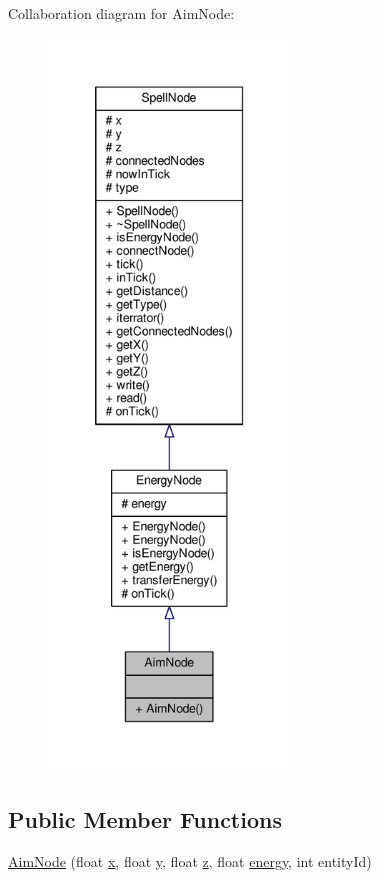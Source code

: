Collaboration diagram for Aim\-Node\-:
\nopagebreak
\begin{figure}[H]
\begin{center}
\leavevmode
\includegraphics[height=550pt]{class_aim_node__coll__graph}
\end{center}
\end{figure}
\subsection*{Public Member Functions}
\begin{DoxyCompactItemize}
\item 
\hyperlink{class_aim_node_a3344a03af5a5fef82bc665e55dc68d3f}{Aim\-Node} (float \hyperlink{class_spell_node_a916f2a709a674dd2a61530b6acc339cc}{x}, float \hyperlink{class_spell_node_a754d80fd0fd82dbc12443b5f277b9fb4}{y}, float \hyperlink{class_spell_node_aff090331ff1bd816a22e974a50c1a180}{z}, float \hyperlink{class_energy_node_ac2cd46828178316e24f339489f553852}{energy}, int entity\-Id)
\end{DoxyCompactItemize}
